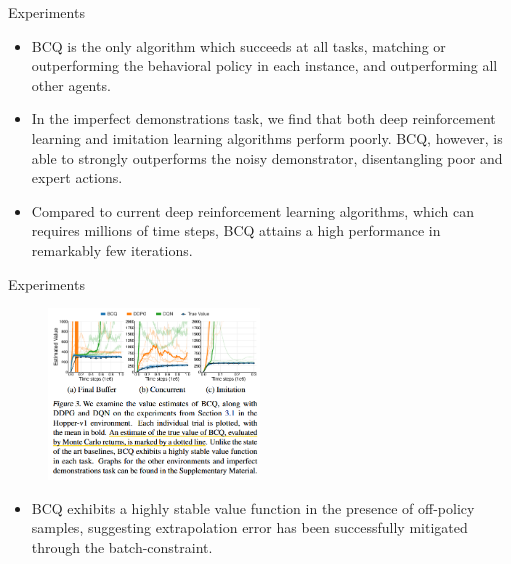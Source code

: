 \documentclass[11pt]{beamer}
\begin{document}
\begin{frame}{Experiments}
    \smallskip
    \begin{itemize}
        \item BCQ is the only algorithm which succeeds at all tasks, matching or outperforming the behavioral policy in each instance, and outperforming all other agents.
        \item In the imperfect demonstrations task, we find that both deep reinforcement learning and imitation learning algorithms perform poorly. BCQ, however, is able to strongly outperforms the noisy demonstrator, disentangling poor and expert actions.
        \item Compared to current deep reinforcement learning algorithms, which can requires millions of time steps, BCQ attains a high performance in remarkably few iterations.
    \end{itemize}
\end{frame}

\begin{frame}{Experiments}
    \begin{figure}
        \centering
        \includegraphics[width=0.5\textwidth]{figure3.png}
        \vfill
    \end{figure}

    \begin{itemize}
        \item BCQ exhibits a highly stable value function in the presence of off-policy samples, suggesting extrapolation error has been successfully mitigated through the batch-constraint.
    \end{itemize}
\end{frame}
\end{document}
